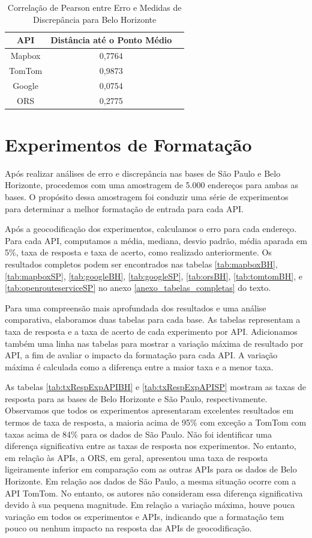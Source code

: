 \begin{table}[!ht]
    \centering
    \caption{Correlação de Pearson entre Erro e Medidas de Discrepância para Belo Horizonte}
    \label{tab:correlationBH}
    \begin{tabular}{|c|c|c|}
    \hline
    API & Distância até o Ponto Médio \\
    \hline
    Mapbox & 0,7764 \\
    TomTom & 0,9873 \\
    Google & 0,0754 \\
    ORS & 0,2775 \\
    \hline
    \end{tabular}
\end{table}

\section{Experimentos de Formatação}

Após realizar análises de erro e discrepância nas bases de São Paulo e Belo Horizonte, procedemos com uma amostragem de 5.000 endereços para ambas as bases. O propósito dessa amostragem foi conduzir uma série de experimentos para determinar a melhor formatação de entrada para cada API.

Após a geocodificação dos experimentos, calculamos o erro para cada endereço. Para cada API, computamos a média, mediana, desvio padrão, média aparada em 5\%, taxa de resposta e taxa de acerto, como realizado anteriormente. Os resultados completos podem ser encontrados nas tabelas \ref{tab:mapboxBH}, \ref{tab:mapboxSP}, \ref{tab:googleBH}, \ref{tab:googleSP}, \ref{tab:orsBH}, \ref{tab:tomtomBH}, e \ref{tab:openrouteserviceSP} no anexo \ref{anexo_tabelas_completas} do texto.

Para uma compreensão mais aprofundada dos resultados e uma análise comparativa, elaboramos duas tabelas para cada base. As tabelas representam a taxa de resposta e a taxa de acerto de cada experimento por API. Adicionamos também uma linha nas tabelas para mostrar a variação máxima de resultado por API, a fim de avaliar o impacto da formatação para cada API. A variação máxima é calculada como a diferença entre a maior taxa e a menor taxa.

As tabelas \ref{tab:txRespExpAPIBH} e \ref{tab:txRespExpAPISP} mostram as taxas de resposta para as bases de Belo Horizonte e São Paulo, respectivamente. Observamos que todos os experimentos apresentaram excelentes resultados em termos de taxa de resposta, a maioria acima de 95\% com exceção a TomTom com taxas acima de 84\% para os dados de São Paulo. Não foi identificar uma diferença significativa entre as taxas de resposta nos experimentos. No entanto, em relação às APIs, a ORS, em geral, apresentou uma taxa de resposta ligeiramente inferior em comparação com as outras APIs para os dados de Belo Horizonte. Em relação aos dados de São Paulo, a mesma situação ocorre com a API TomTom. No entanto, os autores não consideram essa diferença significativa devido à sua pequena magnitude. Em relação a variação máxima, houve pouca variação em todos os experimentos e APIs, indicando que a formatação tem pouco ou nenhum impacto na resposta das APIs de geocodificação. 
 
